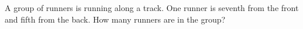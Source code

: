 A group of runners is running along a track. One runner is seventh from the front and fifth from the back. How many runners are in the group?
